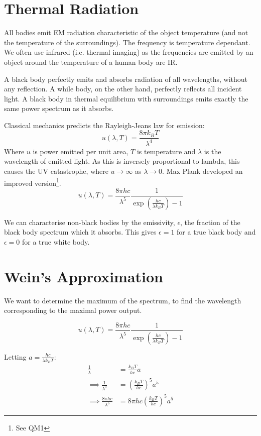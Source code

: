 \section{Thermal Radiation}
All bodies emit EM radiation characteristic of the object temperature (and not the temperature of the surroundings). The frequency is temperature dependant. We often use infrared (i.e. thermal imaging) as the frequencies are emitted by an object around the temperature of a human body are IR.

A black body perfectly emits and absorbs radiation of all wavelengths, without any reflection. A while body, on the other hand, perfectly reflects all incident light. A black body in thermal equilibrium with surroundings emits exactly the same power spectrum as it absorbs.

Classical mechanics predicts the Rayleigh-Jeans law for emission:
\[
    u(\lambda, T) = \frac{8 \pi k_B T}{\lambda^4}
\]
Where $u$ is power emitted per unit area, $T$ is temperature and $\lambda$ is the wavelength of emitted light. As this is inversely proportional to lambda, this causes the UV catastrophe, where $u \to \infty$ as $\lambda \to 0$. Max Plank developed an improved version\footnote{See QM1}.
\[
    u(\lambda, T) = \frac{8 \pi h c}{\lambda^5} \frac{1}{\exp{\left(\frac{hc}{\lambda k_B T}\right)} - 1}
\]

We can characterise non-black bodies by the emissivity, $\epsilon$, the fraction of the black body spectrum which it absorbs. This gives $\epsilon = 1$ for a true black body and $\epsilon = 0$ for a true white body.

\section{Wein's Approximation}
We want to determine the maximum of the spectrum, to find the wavelength corresponding to the maximal power output.

\[
    u(\lambda, T) = \frac{8 \pi h c}{\lambda^5} \frac{1}{\exp{\left(\frac{hc}{\lambda k_B T}\right)} - 1}
\]

Letting $a = \frac{hc}{\lambda k_B T}$:
\begin{align*}
    \frac{1}{\lambda} &= \frac{k_B T}{hc} a\\
    \implies \frac{1}{\lambda^5} &= \left(\frac{k_B T}{hc}\right)^5 a^5\\
    \implies \frac{8 \pi hc}{\lambda^5} &= 8 \pi hc \left(\frac{k_B T}{hc}\right)^5 a^5
\end{align*}

